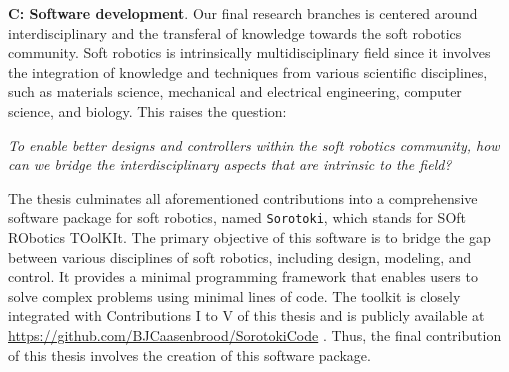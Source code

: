 \textbf{C: Software development}. Our final research branches is centered around interdisciplinary and the transferal of knowledge towards the soft robotics community. Soft robotics is intrinsically multidisciplinary field since it involves the integration of knowledge and techniques from various scientific disciplines, such as materials science, mechanical and electrical engineering, computer science, and biology. This raises the question:

\begin{center}
\textit{To enable better designs and controllers within the soft robotics community, how can we bridge the interdisciplinary aspects that are intrinsic to the field?}
\end{center}
%
The thesis culminates all aforementioned contributions into a comprehensive software package for soft robotics, named \texttt{Sorotoki}, which stands for SOft RObotics TOolKIt. The primary objective of this software is to bridge the gap between various disciplines of soft robotics, including design, modeling, and control. It provides a minimal programming framework that enables users to solve complex problems using minimal lines of code. The toolkit is closely integrated with Contributions I to V of this thesis and is publicly available at \url{https://github.com/BJCaasenbrood/SorotokiCode} \cite{SorotokiCode}. Thus, the final contribution of this thesis involves the creation of this software package.
%
%
